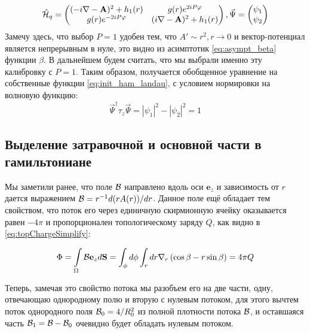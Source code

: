 \documentclass[a4paper,article,14pt]{extarticle}
\begin{document}
$$
\hat {\cal H}_{q} =\begin{pmatrix} (- i \nabla - \mathbf{A} ) ^ 2 + h_1 (r) &  g (r) e^{2 i P \varphi} \\  g (r) e^{-2 i P \varphi}   & ( i \nabla - \mathbf{A} ) ^ 2 + h_1 (r) \end{pmatrix}, \vec{\Psi} = \begin{pmatrix}  \psi_1 \\ \psi_2 \end{pmatrix}
$$
Замечу здесь, что выбор $P=1$ удобен тем, что $A' \sim r^2, r \rightarrow 0$ и вектор-потенциал является непрерывным в нуле, это видно из асимптотик \eqref{eq:asympt_beta} функции $\beta$. В дальнейшем будем считать, что мы выбрали именно эту калибровку с $P=1$. Таким образом, получается обобщенное уравнение на собственные функции \eqref{eq:init_ham_landau}, с условием нормировки на волновую функцию:
$$
\vec{\Psi}^\dagger \tau_z \vec{\Psi} =|\psi_1|^2-|\psi_2|^2=1
$$


\subsection{ Выделение затравочной и основной части в гамильтониане }

Мы заметили ранее, что поле $\cal B$ направлено вдоль оси $\mathbf{e}_z$ и зависимость от $r$ дается выражением  ${\cal B} = r^{-1} d(r A(r))/dr$. Данное поле ещё обладает тем свойством, что поток его через единичную скирмионную ячейку оказывается равен $ -4\pi $ и пропорционален топологическому заряду  $Q$, как видно в \eqref{eq:topChargeSimplify}:

\begin{equation}
\Phi = \int \limits_\Omega {\cal B} \mathbf{e}_z d\mathbf{S} = \int_\phi d \phi \int_r d r \nabla_r \left(\cos\beta   -  r  \sin \beta \right)  = 4 \pi Q
\end{equation}

Теперь, замечая это свойство потока мы разобъем его на две части, одну, отвечающаю однородному полю и вторую с нулевым потоком, для этого вычтем поток однородного поля ${\cal B}_{0} = 4/R_{0}^{2}$  из полной плотности потока  $\cal B$, и оставшаяся часть ${\cal B}_{1} = {\cal B} - {\cal B}_{0}$ очевидно будет обладать нулевым потоком.
 
\end{document}
